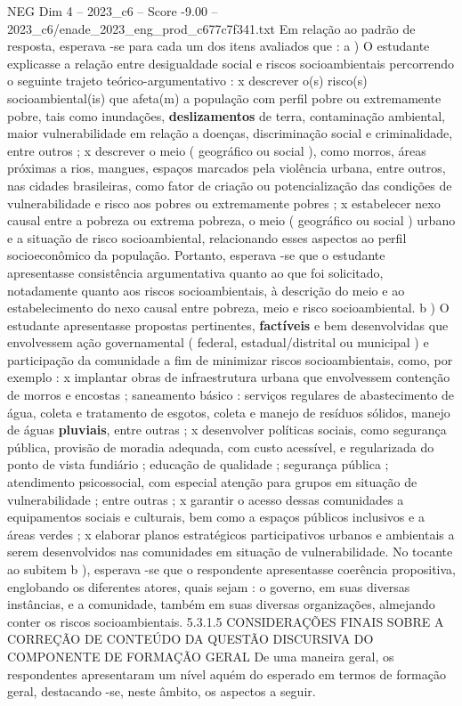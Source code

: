 \begin{textsample}{NEG Dim 4 – 2023\_c6 – Score -9.00 – 2023\_c6/enade\_2023\_eng\_prod\_c677c7f341.txt}
Em relação ao padrão de resposta, esperava -se para cada um dos itens avaliados que : a ) O estudante explicasse a relação entre desigualdade social e riscos socioambientais percorrendo o seguinte trajeto teórico-argumentativo : x descrever o(s) risco(s) socioambiental(is) que afeta(m) a população com perfil pobre ou extremamente pobre, tais como inundações, \textbf{deslizamentos} de terra, contaminação ambiental, maior vulnerabilidade em relação a doenças, discriminação social e criminalidade, entre outros ; x descrever o meio ( geográfico ou social ), como morros, áreas próximas a rios, mangues, espaços marcados pela violência urbana, entre outros, nas cidades brasileiras, como fator de criação ou potencialização das condições de vulnerabilidade e risco aos pobres ou extremamente pobres ; x estabelecer nexo causal entre a pobreza ou extrema pobreza, o meio ( geográfico ou social ) urbano e a situação de risco socioambiental, relacionando esses aspectos ao perfil socioeconômico da população.
Portanto, esperava -se que o estudante apresentasse consistência argumentativa quanto ao que foi solicitado, notadamente quanto aos riscos socioambientais, à descrição do meio e ao estabelecimento do nexo causal entre pobreza, meio e risco socioambiental. b ) O estudante apresentasse propostas pertinentes, \textbf{factíveis} e bem desenvolvidas que envolvessem ação governamental ( federal, estadual/distrital ou municipal ) e participação da comunidade a fim de minimizar riscos socioambientais, como, por exemplo : x implantar obras de infraestrutura urbana que envolvessem contenção de morros e encostas ; saneamento básico : serviços regulares de abastecimento de água, coleta e tratamento de esgotos, coleta e manejo de resíduos sólidos, manejo de águas \textbf{pluviais}, entre outras ; x desenvolver políticas sociais, como segurança pública, provisão de moradia adequada, com custo acessível, e regularizada do ponto de vista fundiário ; educação de qualidade ; segurança pública ; atendimento psicossocial, com especial atenção para grupos em situação de vulnerabilidade ; entre outras ; x garantir o acesso dessas comunidades a equipamentos sociais e culturais, bem como a espaços públicos inclusivos e a áreas verdes ; x elaborar planos estratégicos participativos urbanos e ambientais a serem desenvolvidos nas comunidades em situação de vulnerabilidade.
No tocante ao subitem b ), esperava -se que o respondente apresentasse coerência propositiva, englobando os diferentes atores, quais sejam : o governo, em suas diversas instâncias, e a comunidade, também em suas diversas organizações, almejando conter os riscos socioambientais. 5.3.1.5 CONSIDERAÇÕES FINAIS SOBRE A CORREÇÃO DE CONTEÚDO DA QUESTÃO DISCURSIVA DO COMPONENTE DE FORMAÇÃO GERAL De uma maneira geral, os respondentes apresentaram um nível aquém do esperado em termos de formação geral, destacando -se, neste âmbito, os aspectos a seguir.

\end{textsample}

